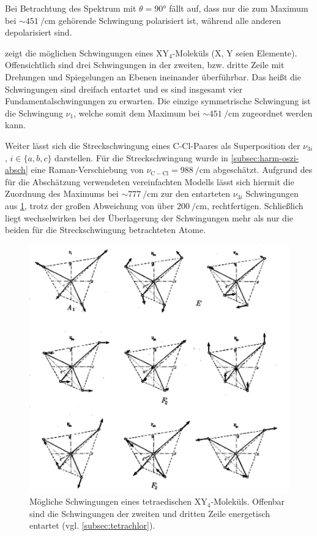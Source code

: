 \documentclass[../bericht.tex]{subfiles}
\begin{document}
        Bei Betrachtung des Spektrum mit $\theta=\ang{90}$ fällt auf, dass nur die zum Maximum bei $\sim\SI{451}{\per\centi\meter}$ gehörende Schwingung polarisiert ist, während alle anderen depolarisiert sind.

         zeigt die möglichen Schwingungen eines $\mathrm{XY_4}$-Moleküls (X, Y seien Elemente). Offensichtlich sind drei Schwingungen in der zweiten, bzw. dritte Zeile mit Drehungen und Spiegelungen an Ebenen ineinander überführbar. Das heißt die Schwingungen sind dreifach entartet und es sind insgesamt vier Fundamentalschwingungen zu erwarten. Die einzige symmetrische Schwingung ist die Schwingung $\nu_1$, welche somit dem Maximum bei $\sim\SI{451}{\per\centi\meter}$ zugeordnet werden kann.
        \medskip

        Weiter lässt sich die Streckschwingung eines C-Cl-Paares als Superposition der $\nu_{3i}$, $i\in\{ a,b,c\}$ darstellen. Für die Streckschwingung wurde in \cref{subsec:harm-oszi-absch} eine Raman-Verschiebung von $\nu_\mathrm{C-Cl}=\SI{988}{\per\centi\meter}$ abgeschätzt. Aufgrund des für die Abschätzung verwendeten vereinfachten Modells lässt sich hiermit die Zuordnung des Maximums bei $\sim \SI{777}{\per\centi\meter}$ zur den entarteten $\nu_{3i}$ Schwingungen aus \cref{fig:tetraeder-schwingungen}, trotz der großen Abweichung von über $\SI{200}{\per\centi\meter}$, rechtfertigen. Schließlich liegt wechselwirken bei der Überlagerung der Schwingungen mehr als nur die beiden für die Streckschwingung betrachteten Atome.
        \medskip

        \begin{figure}[tbp]
          \includegraphics[width=\textwidth]{figures/tetraeder.png}
          \caption[Mögliche Schwingungen eines tetraedischen $\mathrm{XY_4}$-Moleküls.]{Mögliche Schwingungen eines tetraedischen $\mathrm{XY_4}$-Moleküls. Offenbar sind die Schwingungen der zweiten und dritten Zeile energetisch entartet (vgl. \cref{subsec:tetrachlor}). \cite{herzberg}}
          \label{fig:tetraeder-schwingungen}
        \end{figure}
\end{document}
